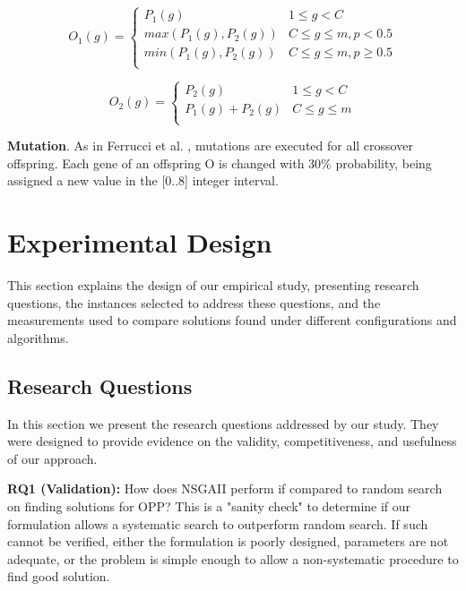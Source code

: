 \documentclass[conference]{IEEEtran}
\begin{document}
\setlength\abovedisplayskip{0pt}
\setlength\belowdisplayshortskip{0pt}
\begin{small}
\begin{equation}
O_{1}(g)=
\left \{
\begin{array}{ll}
P_{1}(g) & 1\leq g < C \\
max(P_{1}(g), P_{2}(g)) & C\leq g\leq m,p < 0.5 \\
min(P_{1}(g), P_{2}(g)) & C\leq g\leq m,p \geq 0.5 \\
\end{array}
\right.
\end{equation}

\setlength\abovedisplayshortskip{0pt}
\setlength\belowdisplayshortskip{0pt}
\small
\begin{equation}
O_{2}(g)=
\left \{
\begin{array}{ll}
P_{2}(g)& 1\leq g < C \\
P_{1}(g)+P_{2}(g) & C\leq g\leq m\\
\end{array}
\right.
\end{equation}
\end{small}

\noindent
\textbf{Mutation}. As in Ferrucci et al. \cite{Ferrucci:2013}, mutations are executed for all crossover offspring. Each gene of an offspring O is changed with 30\% probability, being assigned a new value in the [0..8] integer interval.

\section{Experimental Design}
This section explains the design of our empirical study, presenting research questions, the instances selected to address these questions, and the measurements used to compare solutions found under different configurations and algorithms.
\subsection{Research Questions}

In this section we present the research questions addressed by our study. They were designed to provide evidence on the validity, competitiveness, and usefulness of our approach.

\noindent
\textbf{RQ1 (Validation):} How does NSGAII perform if compared to random search on finding solutions for OPP? This is a "sanity check" to determine if our formulation allows a systematic search to outperform random search. If such cannot be verified, either the formulation is poorly designed, parameters are not adequate, or the problem is simple enough to allow a non-systematic procedure to find good solution.
\end{document}
